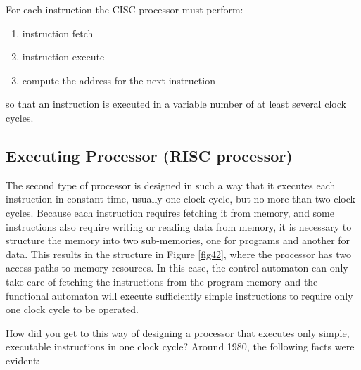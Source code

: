 For each instruction the CISC processor must perform:
\begin{enumerate}
    \item instruction fetch
    \item instruction execute
    \item compute the address for the next instruction
\end{enumerate}


\hspace{-5mm}so that an instruction is executed in a variable number of at least several clock cycles.

\subsection{Executing Processor (RISC processor)}

The second type of processor is designed in such a way that it executes each instruction in constant time, usually one clock cycle, but no more than two clock cycles. Because each instruction requires fetching it from memory, and some instructions also require writing or reading data from memory, it is necessary to structure the memory into two sub-memories, one for programs and another for data. This results in the structure in Figure \ref{fig42}, where the processor has two access paths to memory resources.
In this case, the control automaton can only take care of fetching the instructions from the program memory and the functional automaton will execute sufficiently simple instructions to require only one clock cycle to be operated.

How did you get to this way of designing a processor that executes only simple, executable instructions in one clock cycle? Around 1980, the following facts were evident:


